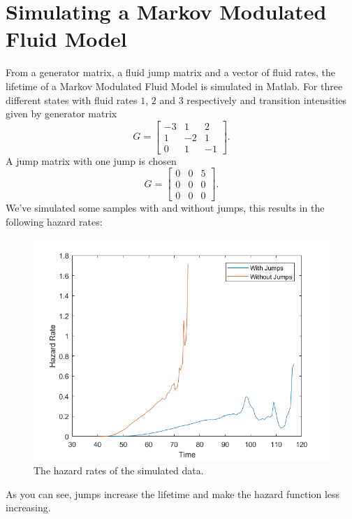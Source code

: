 


\chapter{Simulating a Markov Modulated Fluid Model}
From a generator matrix, a fluid jump matrix and a vector of fluid rates, the lifetime of a Markov Modulated Fluid Model is simulated in Matlab.
For three different states with fluid rates $1$, $2$ and $3$ respectively and transition intensities given by generator matrix
\begin{equation}
G=\begin{bmatrix}
-3& 1& 2\\ 1& -2& 1\\ 0&1&-1
\end{bmatrix}.
\end{equation}
A jump matrix with one jump is chosen
\begin{equation}
G=\begin{bmatrix}
0& 0& 5\\ 0& 0& 0\\ 0&0&0
\end{bmatrix}.
\end{equation}
We've simulated some samples with and without jumps, this results in the following hazard rates:
\begin{figure}[H]
\centering
\includegraphics[width=\textwidth]{Plots/MmfmHazards.png}
\caption{The hazard rates of the simulated data.}
\end{figure}
As you can see, jumps increase the lifetime and make the hazard function less increasing.
